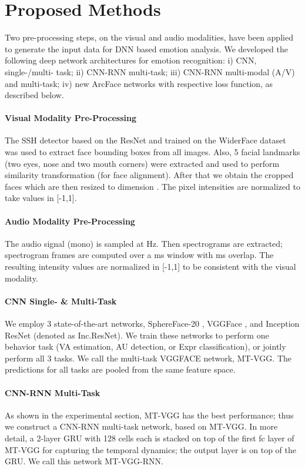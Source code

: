 \documentclass{bmvc2k}
\begin{document}
\section{Proposed Methods}
\vskip-0.15cm
\noindent Two pre-processing steps, on the visual and audio modalities, have been applied to generate the input data for DNN based emotion analysis. We developed the following deep network architectures for emotion recognition: i) CNN, single-/multi- task; ii) CNN-RNN multi-task; iii) CNN-RNN multi-modal (A/V) and multi-task; iv) new ArcFace networks with respective loss function, as described below.  

\paragraph{Visual Modality Pre-Processing}  
The SSH detector \cite{najibi2017ssh} based on the ResNet and trained on the WiderFace dataset \cite{yang2016wider} was used to extract face bounding boxes from all images. Also, 5 facial landmarks (two eyes, nose and two mouth corners) were extracted and used to perform similarity transformation (for face alignment). After that we obtain the cropped faces which are then resized to dimension . The pixel intensities are normalized to take values in [-1,1].

\paragraph{Audio Modality Pre-Processing}  
The audio signal (mono) is sampled at Hz. Then spectrograms are extracted; spectrogram frames are computed over a ms window with ms overlap. The resulting intensity values are normalized in [-1,1] to be consistent with the visual modality.

\paragraph{CNN Single- \& Multi-Task} 
We employ 3 state-of-the-art networks, SphereFace-20 \cite{liu2017sphereface},  VGGFace \cite{parkhi2015deep}, and Inception ResNet \cite{szegedy2017inception} (denoted as Inc.ResNet). We train these networks to perform one behavior task (VA estimation, AU detection, or Expr classification), or jointly  perform all 3 tasks.
We call the multi-task VGGFACE network, MT-VGG.
The predictions for all tasks are pooled from the same feature space.

\paragraph{CNN-RNN Multi-Task} 
As shown in the experimental section, MT-VGG has the best performance; thus we construct a CNN-RNN multi-task network, based on MT-VGG. In more detail, a 2-layer GRU with 128 cells each is stacked on top of the first fc layer of MT-VGG for capturing the temporal dynamics; the output layer is on top of the GRU. We call this network MT-VGG-RNN.
\end{document}
